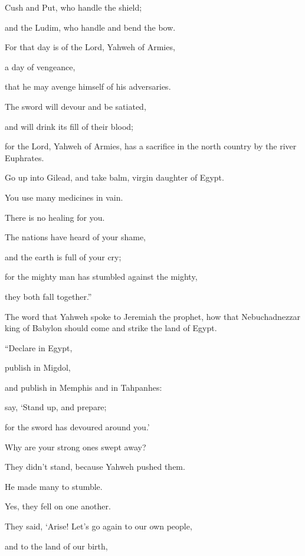 {\par }{\QB Cush and Put, who handle the shield;
\par }{\QB and the Ludim, who handle and bend the bow.
\par }{\Q {}For that day is of the Lord, Yahweh of Armies,
\par }{\QB a day of vengeance,
\par }{\QB that he may avenge himself of his adversaries.
\par }{\Q The sword will devour and be satiated,
\par }{\QB and will drink its fill of their blood;
\par }{\QB for the Lord, Yahweh of Armies, has a sacrifice in the north country by the river Euphrates.
\par }{\Q {}Go up into Gilead, and take balm, virgin daughter of Egypt.
\par }{\QB You use many medicines in vain.
\par }{\QB There is no healing for you.
\par }{\Q {}The nations have heard of your shame,
\par }{\QB and the earth is full of your cry;
\par }{\QB for the mighty man has stumbled against the mighty,
\par }{\QB they both fall together.”
\par }{\BB \par }{\PP {}The word that Yahweh spoke to Jeremiah the prophet, how that Nebuchadnezzar king of Babylon should come and strike the land of Egypt.
\par }{\Q {}“Declare in Egypt,
\par }{\QB publish in Migdol,
\par }{\QB and publish in Memphis and in Tahpanhes:
\par }{\Q say, ‘Stand up, and prepare;
\par }{\QB for the sword has devoured around you.’
\par }{\Q {}Why are your strong ones swept away?
\par }{\QB They didn’t stand, because Yahweh pushed them.
\par }{\Q {}He made many to stumble.
\par }{\QB Yes, they fell on one another.
\par }{\Q They said, ‘Arise! Let’s go again to our own people,
\par }{\QB and to the land of our birth,
}
